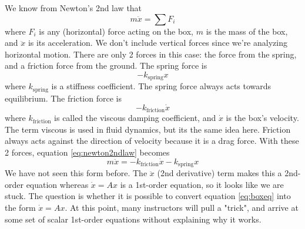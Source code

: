 \documentclass[11pt, oneside]{article}   	%
\begin{document}
We know from Newton's 2nd law that
\begin{equation} \label{eq:newton2ndlaw}
m \ddot{x} = \sum F_i
\end{equation}
where $F_i$ is any (horizontal) force acting on the box, $m$ is the mass of the box, and $\ddot{x}$ is its acceleration.
We don't include vertical forces since we're analyzing horizontal motion.
There are only 2 forces in this case: the force from the spring, and a friction force from the ground.
The spring force is
\begin{equation}
-k_\mathrm{spring} x
\end{equation}
where $k_\mathrm{spring}$ is a stiffness coefficient.
The spring force always acts towards equilibrium.
The friction force is
\begin{equation}
-k_\mathrm{friction} \dot{x}
\end{equation}
where $k_\mathrm{friction}$ is called the viscous damping coefficient, and $\dot{x}$ is the box's velocity.
The term viscous is used in fluid dynamics, but its the same idea here.
Friction always acts against the direction of velocity because it is a drag force.
With these 2 forces, equation \ref{eq:newton2ndlaw} becomes
\begin{equation} \label{eq:boxeq}
m \ddot{x} =
-k_\mathrm{friction} \dot{x}
-k_\mathrm{spring} x
\end{equation}
We have not seen this form before.
The $\ddot{x}$ (2nd derivative) term makes this a 2nd-order equation whereas $\dot{x} = Ax$ is a 1st-order equation, so it looks like we are stuck.
The question is whether it is possible to convert equation \ref{eq:boxeq} into the form $\dot{x} = Ax$.
At this point, many instructors will pull a "trick", and arrive at some set of scalar 1st-order equations without explaining why it works.
\end{document}
